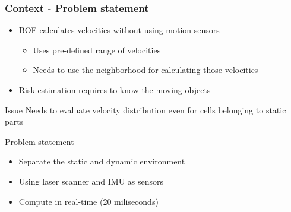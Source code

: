 \documentclass{beamer}
\begin{document}
	\begin{frame}
		\frametitle{Context - Problem statement}

		\begin{itemize}

		\item BOF calculates velocities without using motion sensors
			\begin{itemize}
			\item Uses pre-defined range of velocities
			\item Needs to use the neighborhood for calculating those velocities
			\end{itemize}

		\item Risk estimation requires to know the moving objects

		\end{itemize}

		 \begin{alertblock}{Issue}
		 Needs to evaluate velocity distribution even for cells belonging to static parts
		 \end{alertblock}

		
	
		\begin{block}{Problem statement}	
		
			\begin{itemize}		
			\item Separate the static and dynamic environment
			\item Using laser scanner and IMU as sensors
			\item Compute in real-time (20 miliseconds)
			\end{itemize}		
			
			
		\end{block}
		
	\end{frame}


		
%
%
%
\end{document}
